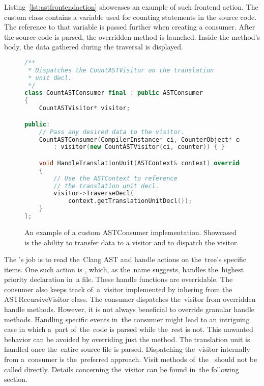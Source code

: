 Listing~\ref{lst:astfrontendaction} showcases an example of such frontend 
action. 
The custom class contains a variable used for counting statements 
in the source code. 
The reference to that variable is passed further when creating a consumer. 
After the source code is parsed, the overridden  
method is launched. 
Inside the method's body, the data gathered during the traversal is 
displayed.

\begin{figure}[H]\centering
\begin{lstlisting}[language=C++]
/**
 * Dispatches the CountASTVisitor on the translation 
 * unit decl.
 */
class CountASTConsumer final : public ASTConsumer
{
	CountASTVisitor* visitor;

public:
	// Pass any desired data to the visitor.
	CountASTConsumer(CompilerInstance* ci, CounterObject* counter)
		: visitor(new CountASTVisitor(ci, counter)) { }

	void HandleTranslationUnit(ASTContext& context) override
	{
		// Use the ASTContext to reference 
		// the translation unit decl.
		visitor->TraverseDecl(
			context.getTranslationUnitDecl());
	}
};
\end{lstlisting}
\caption{An example of a custom ASTConsumer implementation.
Showcased is the ability to transfer data to a visitor and
to dispatch the visitor.}
\label{lst:astconsumer}
\end{figure}

The 's job is to read the~Clang AST and handle actions
on the~tree's specific items. 
One such action is , which, as the~name suggests,
handles the~highest priority declaration in~a file. 
These handle functions are overridable. 
The consumer also keeps track of~a~visitor implemented by inhering from 
the ASTRecursiveVisitor class. 
The consumer dispatches the~visitor from overridden handle methods. 
However, it is not always beneficial to override granular handle methods. 
Handling specific events in~the consumer might lead to an intriguing case 
in which a~part of~the~code is parsed while the~rest is not. 
This unwanted behavior can be avoided by overriding just 
the  method. 
The translation unit is handled once the~entire source file is parsed. 
Dispatching the~visitor internally from a~consumer is the~preferred 
approach. 
Visit methods of~the~ should not be called 
directly. 
Details concerning the~visitor can be found in~the following section.

